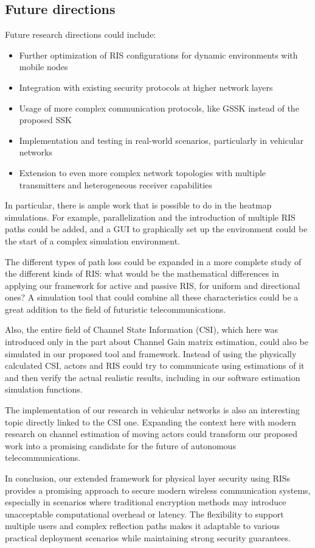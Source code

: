 \newpage
\subsection{Future directions}

Future research directions could include:
\begin{itemize}
  \item Further optimization of RIS configurations for dynamic environments with mobile nodes
  \item Integration with existing security protocols at higher network layers
  \item Usage of more complex communication protocols, like GSSK \cite{4699782} instead of the proposed SSK \cite{5165332}
  \item Implementation and testing in real-world scenarios, particularly in vehicular networks
  \item Extension to even more complex network topologies with multiple transmitters and heterogeneous receiver capabilities
\end{itemize}

In particular, there is ample work that is possible to do in the heatmap simulations. For example, parallelization and the introduction of multiple RIS paths could be added, and a GUI to graphically set up the environment could be the start of a complex simulation environment.

The different types of path loss could be expanded in a more complete study of the different kinds of RIS: what would be the mathematical differences in applying our framework for active and passive RIS, for uniform and directional ones? A simulation tool that could combine all these characteristics could be a great addition to the field of futuristic telecommunications.

Also, the entire field of Channel State Information (CSI), which here was introduced only in the part about Channel Gain matrix estimation, could also be simulated in our proposed tool and framework. Instead of using the physically calculated CSI, actors and RIS could try to communicate using estimations of it and then verify the actual realistic results, including in our software estimation simulation functions.

The implementation of our research in vehicular networks is also an interesting topic directly linked to the CSI one. Expanding the context here with modern research on channel estimation of moving actors could transform our proposed work into a promising candidate for the future of autonomous telecommunications.

In conclusion, our extended framework for physical layer security using RISs provides a promising approach to secure modern wireless communication systems, especially in scenarios where traditional encryption methods may introduce unacceptable computational overhead or latency. The flexibility to support multiple users and complex reflection paths makes it adaptable to various practical deployment scenarios while maintaining strong security guarantees.